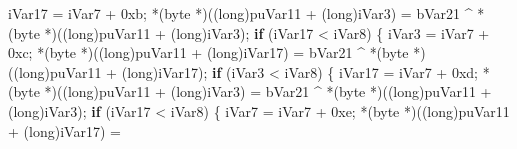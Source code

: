 \documentclass[
]{article}
\newenvironment{Shaded}{}{}
\newcommand{\BaseNTok}[1]{\textcolor[rgb]{0.25,0.63,0.44}{#1}}
\newcommand{\ControlFlowTok}[1]{\textcolor[rgb]{0.00,0.44,0.13}{\textbf{#1}}}
\newcommand{\DataTypeTok}[1]{\textcolor[rgb]{0.56,0.13,0.00}{#1}}
\newcommand{\NormalTok}[1]{#1}
\newcommand{\OperatorTok}[1]{\textcolor[rgb]{0.40,0.40,0.40}{#1}}
\begin{document}
\begin{Shaded}
\begin{Highlighting}[]
\NormalTok{                        iVar17 }\OperatorTok{=}\NormalTok{ iVar7 }\OperatorTok{+} \BaseNTok{0xb}\OperatorTok{;}
                        \OperatorTok{*(}\NormalTok{byte }\OperatorTok{*)((}\DataTypeTok{long}\OperatorTok{)}\NormalTok{puVar11 }\OperatorTok{+} \OperatorTok{(}\DataTypeTok{long}\OperatorTok{)}\NormalTok{iVar3}\OperatorTok{)} \OperatorTok{=}
\NormalTok{                             bVar21 }\OperatorTok{\^{}} \OperatorTok{*(}\NormalTok{byte }\OperatorTok{*)((}\DataTypeTok{long}\OperatorTok{)}\NormalTok{puVar11 }\OperatorTok{+} \OperatorTok{(}\DataTypeTok{long}\OperatorTok{)}\NormalTok{iVar3}\OperatorTok{);}
                        \ControlFlowTok{if} \OperatorTok{(}\NormalTok{iVar17 }\OperatorTok{\textless{}}\NormalTok{ iVar8}\OperatorTok{)} \OperatorTok{\{}
\NormalTok{                          iVar3 }\OperatorTok{=}\NormalTok{ iVar7 }\OperatorTok{+} \BaseNTok{0xc}\OperatorTok{;}
                          \OperatorTok{*(}\NormalTok{byte }\OperatorTok{*)((}\DataTypeTok{long}\OperatorTok{)}\NormalTok{puVar11 }\OperatorTok{+} \OperatorTok{(}\DataTypeTok{long}\OperatorTok{)}\NormalTok{iVar17}\OperatorTok{)} \OperatorTok{=}
\NormalTok{                               bVar21 }\OperatorTok{\^{}} \OperatorTok{*(}\NormalTok{byte }\OperatorTok{*)((}\DataTypeTok{long}\OperatorTok{)}\NormalTok{puVar11 }\OperatorTok{+} \OperatorTok{(}\DataTypeTok{long}\OperatorTok{)}\NormalTok{iVar17}\OperatorTok{);}
                          \ControlFlowTok{if} \OperatorTok{(}\NormalTok{iVar3 }\OperatorTok{\textless{}}\NormalTok{ iVar8}\OperatorTok{)} \OperatorTok{\{}
\NormalTok{                            iVar17 }\OperatorTok{=}\NormalTok{ iVar7 }\OperatorTok{+} \BaseNTok{0xd}\OperatorTok{;}
                            \OperatorTok{*(}\NormalTok{byte }\OperatorTok{*)((}\DataTypeTok{long}\OperatorTok{)}\NormalTok{puVar11 }\OperatorTok{+} \OperatorTok{(}\DataTypeTok{long}\OperatorTok{)}\NormalTok{iVar3}\OperatorTok{)} \OperatorTok{=}
\NormalTok{                                 bVar21 }\OperatorTok{\^{}} \OperatorTok{*(}\NormalTok{byte }\OperatorTok{*)((}\DataTypeTok{long}\OperatorTok{)}\NormalTok{puVar11 }\OperatorTok{+} \OperatorTok{(}\DataTypeTok{long}\OperatorTok{)}\NormalTok{iVar3}\OperatorTok{);}
                            \ControlFlowTok{if} \OperatorTok{(}\NormalTok{iVar17 }\OperatorTok{\textless{}}\NormalTok{ iVar8}\OperatorTok{)} \OperatorTok{\{}
\NormalTok{                              iVar7 }\OperatorTok{=}\NormalTok{ iVar7 }\OperatorTok{+} \BaseNTok{0xe}\OperatorTok{;}
                              \OperatorTok{*(}\NormalTok{byte }\OperatorTok{*)((}\DataTypeTok{long}\OperatorTok{)}\NormalTok{puVar11 }\OperatorTok{+} \OperatorTok{(}\DataTypeTok{long}\OperatorTok{)}\NormalTok{iVar17}\OperatorTok{)} \OperatorTok{=}

\end{Highlighting}
\end{Shaded}
\end{document}
